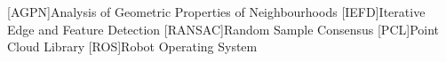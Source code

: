 \newpage
\tableofcontents
\newpage
{}

\begin{acronym}[Grundlagen]
[AGPN]{Analysis of Geometric Properties of Neighbourhoods}
[IEFD]{Iterative Edge and Feature Detection}
[RANSAC]{Random Sample Consensus}
[PCL]{Point Cloud Library}
[ROS]{Robot Operating System}
\end{acronym}
\newpage
\listoffigures
\listoftables
